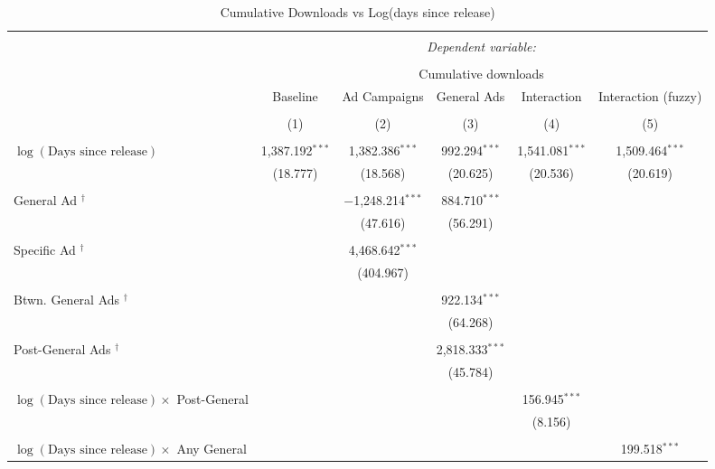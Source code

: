 
\begin{table}[h] \centering 
  \caption{Cumulative Downloads vs Log(days since release)} 
  \label{} 
\small 
\begin{tabular}{@{\extracolsep{5pt}}lccccc} 
\\[-1.8ex]\hline 
\hline \\[-1.8ex] 
 & \multicolumn{5}{c}{\textit{Dependent variable:}} \\ 
\cline{2-6} 
\\[-1.8ex] & \multicolumn{5}{c}{Cumulative downloads} \\ 
 & Baseline & Ad Campaigns & General Ads & Interaction & Interaction (fuzzy) \\ 
\\[-1.8ex] & (1) & (2) & (3) & (4) & (5)\\ 
\hline \\[-1.8ex] 
 $\log{(\text{Days since release})}$ & 1,387.192$^{***}$ & 1,382.386$^{***}$ & 992.294$^{***}$ & 1,541.081$^{***}$ & 1,509.464$^{***}$ \\ 
  & (18.777) & (18.568) & (20.625) & (20.536) & (20.619) \\ 
  & & & & & \\ 
 General Ad $^{\dag}$ &  & $-$1,248.214$^{***}$ & 884.710$^{***}$ &  &  \\ 
  &  & (47.616) & (56.291) &  &  \\ 
  & & & & & \\ 
 Specific Ad $^{\dag}$ &  & 4,468.642$^{***}$ &  &  &  \\ 
  &  & (404.967) &  &  &  \\ 
  & & & & & \\ 
 Btwn. General Ads $^{\dag}$ &  &  & 922.134$^{***}$ &  &  \\ 
  &  &  & (64.268) &  &  \\ 
  & & & & & \\ 
 Post-General Ads $^{\dag}$ &  &  & 2,818.333$^{***}$ &  &  \\ 
  &  &  & (45.784) &  &  \\ 
  & & & & & \\ 
 $\log{(\text{Days since release})} \times$ Post-General &  &  &  & 156.945$^{***}$ &  \\ 
  &  &  &  & (8.156) &  \\ 
  & & & & & \\ 
 $\log{(\text{Days since release})} \times$ Any General &  &  &  &  & 199.518$^{***}$ \\ 

\end{tabular}
\end{table}
